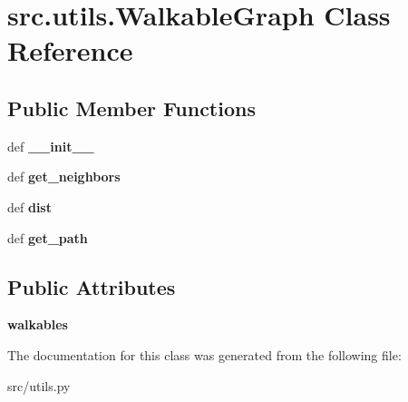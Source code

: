 \hypertarget{classsrc_1_1utils_1_1_walkable_graph}{\section{src.\-utils.\-Walkable\-Graph \-Class \-Reference}
\label{classsrc_1_1utils_1_1_walkable_graph}
}
\subsection*{\-Public \-Member \-Functions}
\begin{DoxyCompactItemize}
\item 
\hypertarget{classsrc_1_1utils_1_1_walkable_graph_a61fad39577edd7672f9ff090ed8be884}{def {\bfseries \-\_\-\-\_\-init\-\_\-\-\_\-}}\label{classsrc_1_1utils_1_1_walkable_graph_a61fad39577edd7672f9ff090ed8be884}

\item 
\hypertarget{classsrc_1_1utils_1_1_walkable_graph_a209beb8622e9c2fb742c6cbc77071d68}{def {\bfseries get\-\_\-neighbors}}\label{classsrc_1_1utils_1_1_walkable_graph_a209beb8622e9c2fb742c6cbc77071d68}

\item 
\hypertarget{classsrc_1_1utils_1_1_walkable_graph_ab4f469cf0e73b91cd576d9526795ff70}{def {\bfseries dist}}\label{classsrc_1_1utils_1_1_walkable_graph_ab4f469cf0e73b91cd576d9526795ff70}

\item 
\hypertarget{classsrc_1_1utils_1_1_walkable_graph_ae4a3c59b8bef04194e4f92f2e8f2b06b}{def {\bfseries get\-\_\-path}}\label{classsrc_1_1utils_1_1_walkable_graph_ae4a3c59b8bef04194e4f92f2e8f2b06b}

\end{DoxyCompactItemize}
\subsection*{\-Public \-Attributes}
\begin{DoxyCompactItemize}
\item 
\hypertarget{classsrc_1_1utils_1_1_walkable_graph_a1df908d75835d45e9304bc698186bbec}{{\bfseries walkables}}\label{classsrc_1_1utils_1_1_walkable_graph_a1df908d75835d45e9304bc698186bbec}

\end{DoxyCompactItemize}


\-The documentation for this class was generated from the following file\-:\begin{DoxyCompactItemize}
\item 
src/utils.\-py\end{DoxyCompactItemize}
